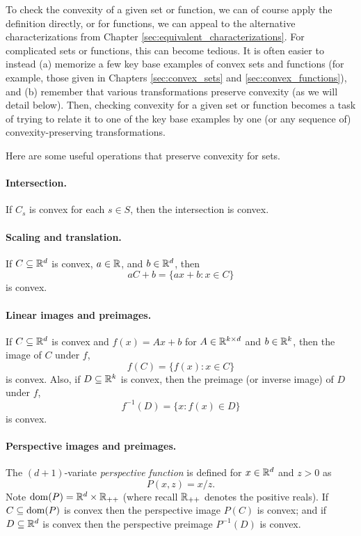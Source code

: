 To check the convexity of a given set or function, we can of course apply the
definition directly, or for functions, we can appeal to the alternative
characterizations from Chapter \ref{sec:equivalent_characterizations}. For
complicated sets or functions, this can become tedious. It is often easier to
instead (a) memorize a few key base examples of convex sets and functions (for
example, those given in Chapters \ref{sec:convex_sets} and
\ref{sec:convex_functions}), and (b) remember that various transformations
preserve convexity (as we will detail below). Then, checking convexity for a
given set or function becomes a task of trying to relate it to one of the key
base examples by one (or any sequence of) convexity-preserving transformations.

Here are some useful operations that preserve convexity for sets.

\paragraph{Intersection.} 

If $C_s$ is convex for each $s \in S$, then the intersection  is convex. 

\paragraph{Scaling and translation.} 

If $C \subseteq \mathbb{R}^d$ is convex, $a \in \mathbb{R}$, and $b \in \mathbb{R}^d$, then 
\[
aC+b = \{ ax + b : x \in C \}
\]
is convex.

\paragraph{Linear images and preimages.} 

If $C \subseteq \mathbb{R}^d$ is convex and $f(x)=Ax+b$ for $A \in \mathbb{R}^{k \times d}$ and
$b \in \mathbb{R}^k$, then the image of $C$ under $f$, 
\[
f(C) = \{ f(x) : x \in C \}
\]
is convex. Also, if $D \subseteq \mathbb{R}^k$ is convex, then the preimage (or
inverse image) of $D$ under $f$,  
\[
f^{-1}(D) = \{ x : f(x) \in D \}
\]
is convex.

\paragraph{Perspective images and preimages.} 

The $(d+1)$-variate \emph{perspective function} is defined for $x \in \mathbb{R}^d$ and
$z>0$ as   
\[
P(x,z) = x/z.
\]
Note $\operatorname{dom}(P)=\mathbb{R}^d \times \mathbb{R}_{++}$ (where recall $\mathbb{R}_{++}$ denotes the    
positive reals). If $C \subseteq \operatorname{dom}(P)$ is convex then the perspective image
$P(C)$ is convex; and if $D \subseteq \mathbb{R}^d$ is convex then the perspective
preimage $P^{-1}(D)$ is convex.  

